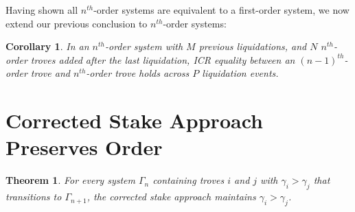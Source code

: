\documentclass[reqno]{article}
\newtheorem{theorem}{Theorem}[section]
\newtheorem{corollary}{Corollary}[theorem]
\begin{document}
\bigskip
Having shown all $n^{th}$-order systems are equivalent to a first-order system, we now extend our previous conclusion to $n^{th}$-order systems:

\begin{corollary} \label{result:7}
  In an $n^{th}$-order system with $M$ previous liquidations, and $N$ $n^{th}$-order troves added after the last liquidation, ICR equality between an $(n-1)^{th}$-order trove and $n^{th}$-order trove holds across $P$ liquidation events.
\end{corollary}

\section{Corrected Stake Approach Preserves Order}

\begin{theorem} \label{result:8}
  For every system $\Gamma_n$ containing troves $i$ and $j$ with $\gamma_i > \gamma_j$ that transitions to $\Gamma_{n+1}$, the corrected stake approach maintains $\gamma_i > \gamma_j$.
\end{theorem}
\end{document}
